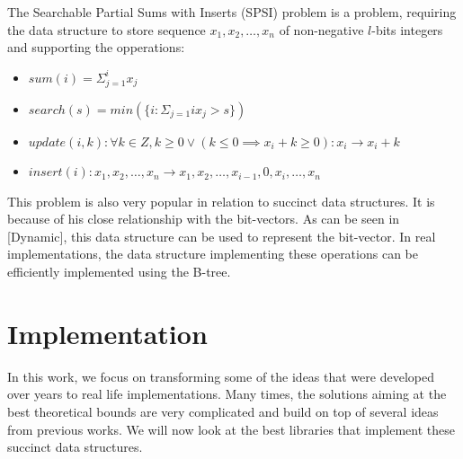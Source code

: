 \begin{theorem}
The Searchable Partial Sums with Inserts (SPSI) problem is a problem, requiring the data structure to
store sequence $x_1, x_2, \ldots , x_n$ of non-negative $l$-bits integers and supporting the opperations:
\begin{itemize}
    \item $sum(i) = \Sigma_{j=1}^{i} x_j$
    \item $search(s) = min(\{i : \Sigma_{j=1}{i} x_j > s \})$
    \item $update(i, k): \forall k \in Z, k \geq 0 \lor (k\leq 0 \implies x_i + k \geq 0): x_i \rightarrow x_i + k$
    \item $insert(i): x_1, x_2,\ldots, x_n \rightarrow x_1, x_2,\ldots , x_{i-1}, 0, x_{i}, \ldots , x_n$
\end{itemize}
\end{theorem}

This problem is also very popular in relation to succinct data structures. It is because of his close relationship with the bit-vectors.
As can be seen in [Dynamic], this data structure can be used to represent the bit-vector. In real implementations, the data structure
implementing these operations can be efficiently implemented using the B-tree.


\section{Implementation}

In this work, we focus on transforming some of the ideas that were developed over years to real life implementations. Many times, the solutions aiming at the best theoretical bounds are
very complicated and build on top of several ideas from previous works. We will now look at the best libraries that implement these succinct data structures.

